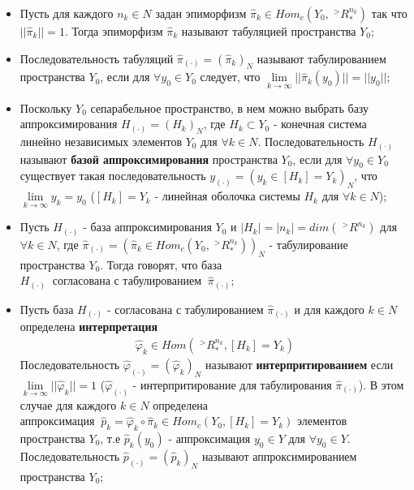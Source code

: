 \begin{itemize}
	\item Пусть для каждого $n_k\in N$ задан эпиморфизм $\hat{\pi}_k\in Hom_c\left(Y_0,\;^>R^{n_k}_{*}\right)$ так что $||\hat{\pi}_k|| = 1$. Тогда эпиморфизм $\hat{\pi}_k$ называют $\textbf{табуляцией}$ пространства $Y_0$;
	\item Последовательность табуляций $\hat{\pi}_{(\cdot)} = \left(\hat{\pi}_k\right)_N$ называют $\textbf{табулированием}$ пространства $Y_0$, если для $\forall y_0\in Y_0$ следует, что $\lim\limits_{k\to\infty}||\hat{\pi}_k(y_0)|| = ||y_0||$;
	\item Поскольку $Y_0$ сепарабельное пространство, в нем можно выбрать базу аппроксимирования $H_{(\cdot)} = \left(H_k\right)_N$, где $H_k \subset Y_0$ - конечная система линейно независимых элементов $Y_0$ для $\forall k\in N$. Последовательность $H_{(\cdot)}$ называют \textbf{базой аппроксимирования} пространства $Y_0$, если для $\forall y_0\in Y_0$ существует такая последовательность $y_{(\cdot)} = \left(y_k\in [H_k] = Y_k\right)_N$, что $\lim\limits_{k\to\infty} y_k = y_0$ ($[H_k] = Y_k$ - линейная оболочка системы $H_k$ для $\forall k\in N$);
	\item Пусть $H_{(\cdot)}$ - база аппроксимирования $Y_0$ и $|H_k| = |n_k| = dim\left(\;^>R^{n_k}\right)$ для $\forall k\in N$, где $\hat{\pi}_{(\cdot)} = \left(\hat{\pi}_k\in Hom_c\left(Y_0,\;^>R^{n_k}_{*}\right)\right)_N$ - табулирование пространства $Y_0$. Тогда говорят, что база $H_{(\cdot)} \;\;\textbf{согласована с табулированием}\;\; \hat{\pi}_{(\cdot)}$;
	\item Пусть база $H_{(\cdot)}$ - согласована с табулированием $\hat{\pi}_{(\cdot)}$ и для каждого $k\in N$ определена \textbf{интерпретация}
	\begin{gather*}
		\hat{\varphi}_k\in Hom\left(\;^>R^{n_k}_{*}, [H_k] = Y_k\right)
	\end{gather*} 
	Последовательность $\hat{\varphi}_{(\cdot)} = \left(\hat{\varphi}_k\right)_N$ называют \textbf{интерпритированием} если $\lim\limits_{k\to\infty}||\hat{\varphi}_k|| = 1$ ($\hat{\varphi}_{(\cdot)}$ - интерпритирование для табулирования $\hat{\pi}_{(\cdot)}$). В этом случае для каждого $k\in N$ определена $\textbf{аппроксимация}\;\; \hat{p}_k = \hat{\varphi}_k \circ \hat{\pi}_k \in Hom_c\left(Y_0, [H_k] = Y_k\right)$ элементов пространства $Y_0$, т.е $\hat{p}_k(y_0)$ - аппроксимация $y_0 \in Y$ для $\forall y_0\in Y$. Последовательность $\hat{p}_{(\cdot)} = \left(\hat{p}_k\right)_N$ называют $\textbf{аппроксимированием}$ пространства $Y_0$;

\end{itemize}
